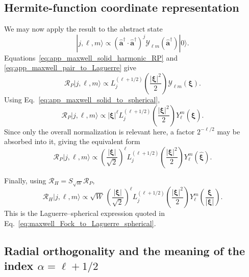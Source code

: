 \documentclass[11pt,oneside]{article}
\numberwithin{equation}{section}
\theoremstyle{definition}
\begin{document}
\subsection{Hermite-function coordinate representation}

We may now apply the result to the abstract state
\begin{equation}
|j,\ell,m\rangle
\propto
\left(
\hat{\bm a}^\dagger\cdot
\hat{\bm a}^\dagger
\right)^j
\mathcal Y_{\ell m}(\hat{\bm a}^\dagger)|0\rangle .
\end{equation}
Equations~\eqref{eq:app_maxwell_solid_harmonic_RP} and
\eqref{eq:app_maxwell_pair_to_Laguerre} give
\begin{equation}
\mathcal R_P|j,\ell,m\rangle
\propto
L_j^{(\ell+1/2)}
\left(
\frac{|\bm\xi|^2}{2}
\right)
\mathcal Y_{\ell m}(\bm\xi).
\label{eq:app_maxwell_RP_jlm_Laguerre_solid}
\end{equation}
Using Eq.~\eqref{eq:app_maxwell_solid_to_spherical},
\begin{equation}
\mathcal R_P|j,\ell,m\rangle
\propto
|\bm\xi|^\ell
L_j^{(\ell+1/2)}
\left(
\frac{|\bm\xi|^2}{2}
\right)
Y_\ell^m(\widehat{\bm\xi}).
\label{eq:app_maxwell_RP_jlm_Laguerre_spherical}
\end{equation}
Since only the overall normalization is relevant here, a factor
$2^{-\ell/2}$ may be absorbed into it, giving the equivalent form
\begin{equation}
\mathcal R_P|j,\ell,m\rangle
\propto
\left(
\frac{|\bm\xi|}{\sqrt2}
\right)^\ell
L_j^{(\ell+1/2)}
\left(
\frac{|\bm\xi|^2}{2}
\right)
Y_\ell^m(\widehat{\bm\xi}).
\label{eq:app_maxwell_RP_jlm_final}
\end{equation}

Finally, using
$\mathcal R_H=S_{\sqrt W}\mathcal R_P$,
\begin{equation}
\mathcal R_H|j,\ell,m\rangle
\propto
\sqrt W\,
\left(
\frac{|\bm\xi|}{\sqrt2}
\right)^\ell
L_j^{(\ell+1/2)}
\left(
\frac{|\bm\xi|^2}{2}
\right)
Y_\ell^m
\left(
\frac{\bm\xi}{|\bm\xi|}
\right).
\label{eq:app_maxwell_RH_jlm_Laguerre_spherical}
\end{equation}
This is the Laguerre--spherical expression quoted in
Eq.~\eqref{eq:maxwell_Fock_to_Laguerre_spherical}.

\subsection{Radial orthogonality and the meaning of the index \texorpdfstring{$\alpha=\ell+1/2$}{alpha=l+1/2}}
\end{document}
